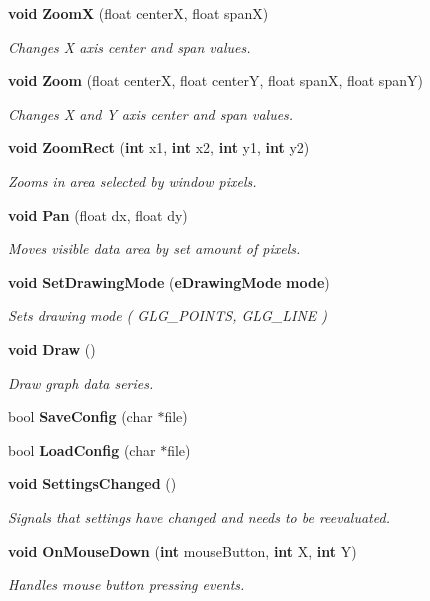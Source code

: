 \begin{DoxyCompactItemize}
{\bf void} {\bf ZoomX} (float centerX, float spanX)
\begin{DoxyCompactList}\small\item\em Changes X axis center and span values. \end{DoxyCompactList}\item 
{\bf void} {\bf Zoom} (float centerX, float centerY, float spanX, float spanY)
\begin{DoxyCompactList}\small\item\em Changes X and Y axis center and span values. \end{DoxyCompactList}\item 
{\bf void} {\bf Zoom\+Rect} ({\bf int} x1, {\bf int} x2, {\bf int} y1, {\bf int} y2)
\begin{DoxyCompactList}\small\item\em Zooms in area selected by window pixels. \end{DoxyCompactList}\item 
{\bf void} {\bf Pan} (float dx, float dy)
\begin{DoxyCompactList}\small\item\em Moves visible data area by set amount of pixels. \end{DoxyCompactList}\item 
{\bf void} {\bf Set\+Drawing\+Mode} ({\bf e\+Drawing\+Mode} {\bf mode})
\begin{DoxyCompactList}\small\item\em Sets drawing mode ( G\+L\+G\+\_\+\+P\+O\+I\+N\+TS, G\+L\+G\+\_\+\+L\+I\+NE ) \end{DoxyCompactList}\item 
{\bf void} {\bf Draw} ()
\begin{DoxyCompactList}\small\item\em Draw graph data series. \end{DoxyCompactList}\item 
bool {\bf Save\+Config} (char $\ast$file)
\item 
bool {\bf Load\+Config} (char $\ast$file)
\item 
{\bf void} {\bf Settings\+Changed} ()
\begin{DoxyCompactList}\small\item\em Signals that settings have changed and needs to be reevaluated. \end{DoxyCompactList}\item 
{\bf void} {\bf On\+Mouse\+Down} ({\bf int} mouse\+Button, {\bf int} X, {\bf int} Y)
\begin{DoxyCompactList}\small\item\em Handles mouse button pressing events. \end{DoxyCompactList}\item 

\end{DoxyCompactItemize}
